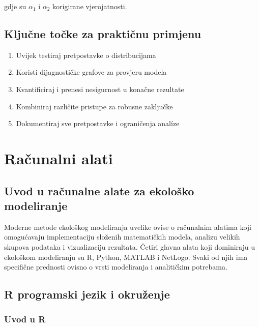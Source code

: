 \documentclass[11pt,oneside]{book}
\begin{document}
gdje su $\alpha_1$ i $\alpha_2$ korigirane vjerojatnosti.

\subsection{Ključne točke za praktičnu primjenu}

\begin{enumerate}
	\item Uvijek testiraj pretpostavke o distribucijama
	\item Koristi dijagnostičke grafove za provjeru modela
	\item Kvantificiraj i prenesi nesigurnost u konačne rezultate
	\item Kombiniraj različite pristupe za robusne zaključke
	\item Dokumentiraj sve pretpostavke i ograničenja analíze
\end{enumerate}





\section{Računalni alati}

\subsection{Uvod u računalne alate za ekološko modeliranje}

Moderne metode ekološkog modeliranja uvelike ovise o računalnim alatima koji omogućavaju implementaciju složenih matematičkih modela, analizu velikih skupova podataka i vizualizaciju rezultata. Četiri glavna alata koji dominiraju u ekološkom modeliranju su R, Python, MATLAB i NetLogo. Svaki od njih ima specifične prednosti ovisno o vrsti modeliranja i analitičkim potrebama.

\subsection{R programski jezik i okruženje}

\subsubsection{Uvod u R}
\end{document}
